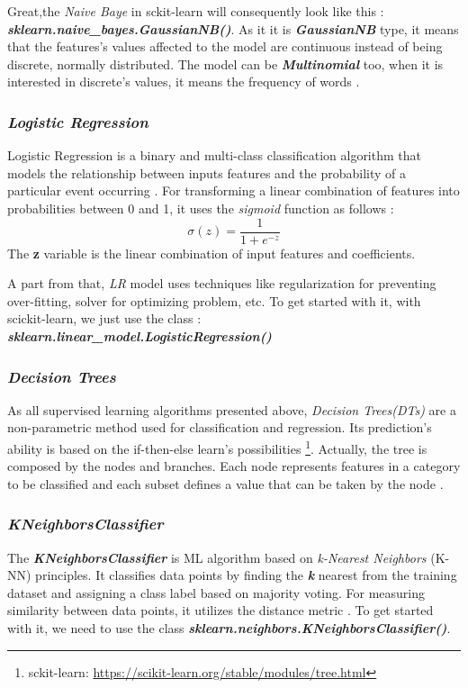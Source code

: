 \documentclass[12pt,a4paper]{report}
\begin{document}
Great,the \textit{Naive Baye} in sckit-learn will consequently look like this : \newline
\textbf{\textit{sklearn.naive\_bayes.GaussianNB()}}. As it it is \textbf{\textit{GaussianNB}} type, it means that the features's values affected to the model are continuous instead of being discrete, normally distributed. The model can be \textbf{\textit{Multinomial}} too, when it is interested in discrete's values, it means the frequency of words .
\subsubsection{\textit{Logistic Regression}} 
Logistic Regression is a binary and multi-class classification algorithm that models the relationship between inputs features and the probability of a particular event occurring \cite{rymarczyk2019logistic}. For transforming a linear combination of features into probabilities between 0 and 1, it uses the \textit{sigmoid} function as follows :
\begin{equation} 
\label{sigmoidFunction}
\sigma(z) = \frac{1}{1 + e^{-z}}
\end{equation} 
The \textbf{z} variable is the linear combination of input features and coefficients. 

A part from that, \textit{LR} model uses techniques like regularization for preventing over-fitting, solver for optimizing problem, etc.
To get started with it, with scickit-learn, we just use the class :
\textbf{\textit{sklearn.linear\_model.LogisticRegression()}} 

\subsubsection{\textit{Decision Trees}} 
As all supervised learning algorithms presented above, \textit{Decision Trees(DTs)} are a non-parametric method used for classification and regression. Its prediction's ability is based on the if-then-else learn's possibilities \footnote{sckit-learn: \url{https://scikit-learn.org/stable/modules/tree.html} }. Actually, the tree is composed by the nodes and branches. Each node represents features in a category to be classified and each subset defines a value that can be taken by the node \cite{charbuty2021classification}.  

\subsubsection{\textit{KNeighborsClassifier}}
The \textbf{\textit{KNeighborsClassifier}} is ML algorithm based on \textit{k-Nearest Neighbors} (K-NN) principles. It classifies data points by finding the \textbf{\textit{k}} nearest from the training dataset and assigning a class label based on majority voting. For measuring similarity between data points, it utilizes the distance metric \cite{nayak2022study}. 
To get started with it, we need to use the class\textbf{ \textit{sklearn.neighbors.KNeighborsClassifier()}}. 
\end{document}
